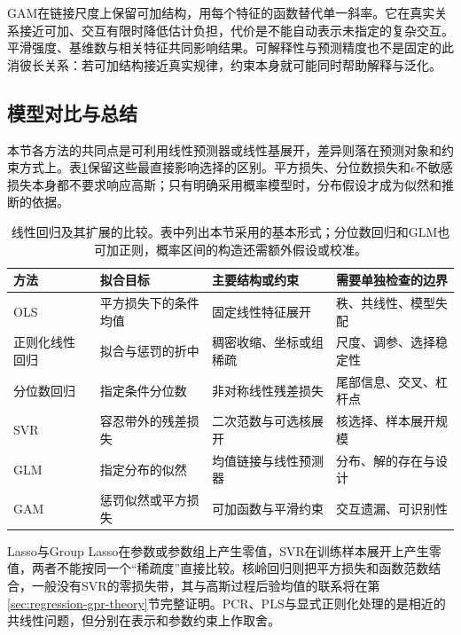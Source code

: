 GAM在链接尺度上保留可加结构，用每个特征的函数替代单一斜率。它在真实关系接近可加、交互有限时降低估计负担，代价是不能自动表示未指定的复杂交互。平滑强度、基维数与相关特征共同影响结果。可解释性与预测精度也不是固定的此消彼长关系：若可加结构接近真实规律，约束本身就可能同时帮助解释与泛化。

\subsection{模型对比与总结}
\label{sec:regression-linear-summary}

本节各方法的共同点是可利用线性预测器或线性基展开，差异则落在预测对象和约束方式上。表\ref{tab:regression-linear-comparison}保留这些最直接影响选择的区别。平方损失、分位数损失和$\epsilon$不敏感损失本身都不要求响应高斯；只有明确采用概率模型时，分布假设才成为似然和推断的依据。

\begin{table}[htbp]
  \centering
  \begin{tabularx}{\linewidth}{@{}l>{\RaggedRight\arraybackslash}X>{\RaggedRight\arraybackslash}X>{\RaggedRight\arraybackslash}X@{}}
    \toprule
    方法 & 拟合目标 & 主要结构或约束 & 需要单独检查的边界\\
    \midrule
    OLS & 平方损失下的条件均值 & 固定线性特征展开 & 秩、共线性、模型失配\\
    正则化线性回归 & 拟合与惩罚的折中 & 稠密收缩、坐标或组稀疏 & 尺度、调参、选择稳定性\\
    分位数回归 & 指定条件分位数 & 非对称线性残差损失 & 尾部信息、交叉、杠杆点\\
    SVR & 容忍带外的残差损失 & 二次范数与可选核展开 & 核选择、样本展开规模\\
    GLM & 指定分布的似然 & 均值链接与线性预测器 & 分布、解的存在与设计\\
    GAM & 惩罚似然或平方损失 & 可加函数与平滑约束 & 交互遗漏、可识别性\\
    \bottomrule
  \end{tabularx}
  \caption{线性回归及其扩展的比较。表中列出本节采用的基本形式；分位数回归和GLM也可加正则，概率区间的构造还需额外假设或校准。}
  \label{tab:regression-linear-comparison}
\end{table}

Lasso与Group Lasso在参数或参数组上产生零值，SVR在训练样本展开上产生零值，两者不能按同一个“稀疏度”直接比较。核岭回归则把平方损失和函数范数结合，一般没有SVR的零损失带，其与高斯过程后验均值的联系将在第\ref{sec:regression-gpr-theory}节完整证明。PCR、PLS与显式正则化处理的是相近的共线性问题，但分别在表示和参数约束上作取舍。

